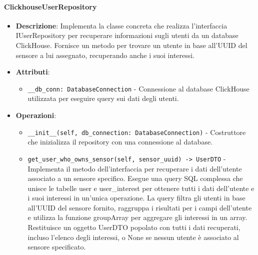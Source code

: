 \documentclass[10pt]{article}
\begin{document}
    \paragraph{ClickhouseUserRepository}
    \begin{itemize} 
    \item \textbf{Descrizione}: Implementa la classe concreta che realizza l'interfaccia IUserRepository per recuperare informazioni sugli utenti da un database ClickHouse. Fornisce un metodo per trovare un utente in base all'UUID del sensore a lui assegnato, recuperando anche i suoi interessi.
    \item \textbf{Attributi}:
    \begin{itemize}
        \item \texttt{\_\_db\_conn: DatabaseConnection} - Connessione al database ClickHouse utilizzata per eseguire query sui dati degli utenti.
    \end{itemize}
    
    \item \textbf{Operazioni}:
    \begin{itemize}
        \item \texttt{\_\_init\_\_(self, db\_connection: DatabaseConnection)} - Costruttore che inizializza il repository con una connessione al database.
        
        \item \texttt{get\_user\_who\_owns\_sensor(self, sensor\_uuid) -> UserDTO} - Implementa il metodo dell'interfaccia per recuperare i dati dell'utente associato a un sensore specifico. Esegue una query SQL complessa che unisce le tabelle user e user\_interest per ottenere tutti i dati dell'utente e i suoi interessi in un'unica operazione. La query filtra gli utenti in base all'UUID del sensore fornito, raggruppa i risultati per i campi dell'utente e utilizza la funzione groupArray per aggregare gli interessi in un array. Restituisce un oggetto UserDTO popolato con tutti i dati recuperati, incluso l'elenco degli interessi, o None se nessun utente è associato al sensore specificato.
    \end{itemize}
    \end{itemize}
\end{document}
